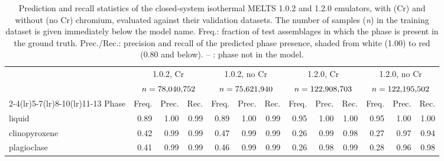 \begin{table}[!htbp]
\centering
\footnotesize
\setlength{\tabcolsep}{2.2pt}
\setlength{\aboverulesep}{0pt}
\setlength{\belowrulesep}{0pt}
\renewcommand{\arraystretch}{1.15}
\caption{Prediction and recall statistics of the closed-system isothermal \textsc{MELTS} 1.0.2 and 1.2.0 emulators, with (Cr) and without (no Cr) chromium, 
evaluated against their validation datasets. The number of samples (\emph{n}) in the training dataset is given immediately below the model name. 
Freq.: fraction of test assemblages in which the phase is present in the ground truth. Prec./Rec.: precision and recall of the predicted phase presence, 
shaded from white (1.00) to red (0.80 and below). -- : phase not in the model.}
\label{tab:ch4-quality-melts}

\begin{tabular}{@{}l|rrr|rrr|rrr|rrr@{}}
\toprule
 & \multicolumn{3}{|c}{1.0.2, Cr} & \multicolumn{3}{|c}{1.0.2, no Cr} & \multicolumn{3}{|c}{1.2.0, Cr} & \multicolumn{3}{|c}{1.2.0, no Cr} \\
 & \multicolumn{3}{|c}{$n = 78{,}040{,}752$} & \multicolumn{3}{|c}{$n = 75{,}621{,}940$} & \multicolumn{3}{|c}{$n = 122{,}908{,}703$} & \multicolumn{3}{|c}{$n = 122{,}195{,}502$} \\
\cmidrule(lr){2-4}\cmidrule(lr){5-7}\cmidrule(lr){8-10}\cmidrule(lr){11-13}
Phase & Freq. & Prec. & Rec. & Freq. & Prec. & Rec. & Freq. & Prec. & Rec. & Freq. & Prec. & Rec. \\
\midrule
liquid & 0.89 & \cellcolor[RGB]{254,252,252}1.00 & \cellcolor[RGB]{254,251,251}0.99 & 0.89 & \cellcolor[RGB]{254,252,252}1.00 & \cellcolor[RGB]{254,251,251}0.99 & 0.95 & \cellcolor[RGB]{255,253,253}1.00 & \cellcolor[RGB]{255,253,253}1.00 & 0.95 & \cellcolor[RGB]{255,253,253}1.00 & \cellcolor[RGB]{255,254,253}1.00 \\
clinopyroxene & 0.42 & \cellcolor[RGB]{254,250,249}0.99 & \cellcolor[RGB]{254,246,246}0.99 & 0.47 & \cellcolor[RGB]{254,248,247}0.99 & \cellcolor[RGB]{253,245,244}0.99 & 0.26 & \cellcolor[RGB]{253,245,244}0.99 & \cellcolor[RGB]{253,241,240}0.98 & 0.27 & \cellcolor[RGB]{252,238,237}0.97 & \cellcolor[RGB]{248,216,214}0.94 \\
plagioclase & 0.41 & \cellcolor[RGB]{254,250,249}0.99 & \cellcolor[RGB]{254,248,248}0.99 & 0.46 & \cellcolor[RGB]{254,248,247}0.99 & \cellcolor[RGB]{254,248,247}0.99 & 0.26 & \cellcolor[RGB]{253,243,243}0.98 & \cellcolor[RGB]{253,245,245}0.99 & 0.28 & \cellcolor[RGB]{251,230,228}0.96 & \cellcolor[RGB]{253,245,244}0.98 \\

\end{tabular}
\end{table}
